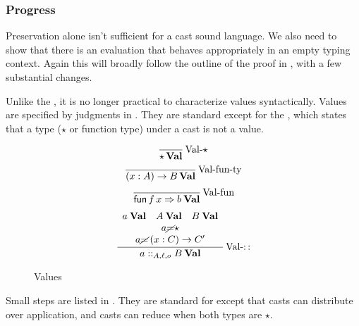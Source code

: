  
\subsubsection{Progress}
 
Preservation alone isn't sufficient for a cast sound language.
We also need to show that there is an evaluation that behaves appropriately in an empty typing context.
Again this will broadly follow the outline of the \slang{} proof in , with a few substantial changes.
 
Unlike the \slang{}, it is no longer practical to characterize values syntactically.
Values are specified by judgments in .
They are standard except for the , which states that a type ($\star$ or function type) under a cast is not a value.
 
\begin{figure}
\[
\frac{\,}{\star\,\textbf{Val}}
\operatorname{Val-\star}
\]
\[
\frac{\,}{\left(x:A\right)\rightarrow B\,\textbf{Val}}
\operatorname{Val-fun-ty}
\]
\[
\frac{\,}{\mathsf{fun}\,f\,x\Rightarrow b\:\textbf{Val}}
\operatorname{Val-fun}
\]
\[
\frac{\begin{array}{c}
a\:\textbf{Val}\quad A\:\textbf{Val}\quad B\:\textbf{Val}\\
a\cancel{=}\star\\
a\cancel{=}\left(x:C\right)\rightarrow C'
\end{array}}{a::_{A,\ell, o}B\:\textbf{Val}}
\operatorname{Val-::}
\]
\caption{\CLang{} Values}
\label{fig:cast-val}
\end{figure}
 
Small steps are listed in .
They are standard for \cbv{} except that casts can distribute over application, and casts can reduce when both types are $\star$.
 
